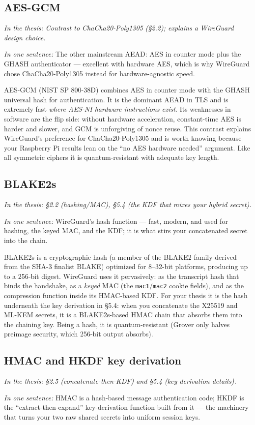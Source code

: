\documentclass[11pt]{article}
\newcommand{\seethesis}[1]{%
  {\small\color{softgray}\textit{In the thesis: #1}}\par\vspace{3pt}}
\newcommand{\nutshell}[1]{\noindent\textit{In one sentence:} #1\par\vspace{4pt}}
\begin{document}
\subsection{AES-GCM}
\seethesis{Contrast to ChaCha20-Poly1305 (\S2.2); explains a WireGuard design choice.}
\nutshell{The other mainstream AEAD: AES in counter mode plus the GHASH
authenticator --- excellent with hardware AES, which is why WireGuard chose
ChaCha20-Poly1305 instead for hardware-agnostic speed.}

AES-GCM (NIST SP 800-38D) combines AES in counter mode with the GHASH universal
hash for authentication. It is the dominant AEAD in TLS and is extremely fast
\emph{where AES-NI hardware instructions exist}. Its weaknesses in software are
the flip side: without hardware acceleration, constant-time AES is harder and
slower, and GCM is unforgiving of nonce reuse. This contrast explains WireGuard's
preference for ChaCha20-Poly1305 and is worth knowing because your Raspberry Pi
results lean on the ``no AES hardware needed'' argument. Like all symmetric
ciphers it is quantum-resistant with adequate key length.

\subsection{BLAKE2s}
\seethesis{\S2.2 (hashing/MAC), \S5.4 (the KDF that mixes your hybrid secret).}
\nutshell{WireGuard's hash function --- fast, modern, and used for hashing, the
keyed MAC, and the KDF; it is what stirs your concatenated secret into the chain.}

BLAKE2s is a cryptographic hash (a member of the BLAKE2 family derived from the
SHA-3 finalist BLAKE) optimized for 8--32-bit platforms, producing up to a
256-bit digest. WireGuard uses it pervasively: as the transcript hash that binds
the handshake, as a \emph{keyed} MAC (the \texttt{mac1}/\texttt{mac2} cookie
fields), and as the compression function inside its HMAC-based KDF. For your
thesis it is the hash underneath the key derivation in \S5.4: when you
concatenate the X25519 and ML-KEM secrets, it is a BLAKE2s-based HMAC chain that
absorbs them into the chaining key. Being a hash, it is quantum-resistant
(Grover only halves preimage security, which 256-bit output absorbs).

\subsection{HMAC and HKDF key derivation}
\seethesis{\S2.5 (concatenate-then-KDF) and \S5.4 (key derivation details).}
\nutshell{HMAC is a hash-based message authentication code; HKDF is the
``extract-then-expand'' key-derivation function built from it --- the machinery
that turns your two raw shared secrets into uniform session keys.}
\end{document}
